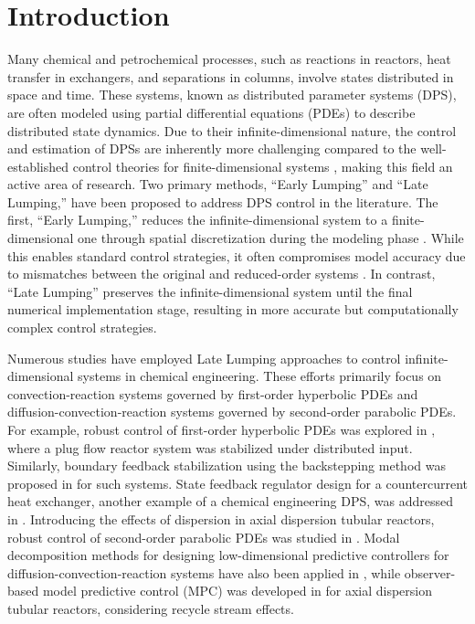 \section{Introduction}

Many chemical and petrochemical processes, such as reactions in reactors, heat transfer in exchangers, and separations in columns, involve states distributed in space and time. These systems, known as distributed parameter systems (DPS), are often modeled using partial differential equations (PDEs) to describe distributed state dynamics. Due to their infinite-dimensional nature, the control and estimation of DPSs are inherently more challenging compared to the well-established control theories for finite-dimensional systems \cite{ray1981advanced}, making this field an active area of research. Two primary methods, “Early Lumping” and “Late Lumping,” have been proposed to address DPS control in the literature. The first, “Early Lumping,” reduces the infinite-dimensional system to a finite-dimensional one through spatial discretization during the modeling phase \cite{davison1976robust}. While this enables standard control strategies, it often compromises model accuracy due to mismatches between the original and reduced-order systems \cite{moghadam2012infinite}. In contrast, “Late Lumping” preserves the infinite-dimensional system until the final numerical implementation stage, resulting in more accurate but computationally complex control strategies.

Numerous studies have employed Late Lumping approaches to control infinite-dimensional systems in chemical engineering. These efforts primarily focus on convection-reaction systems governed by first-order hyperbolic PDEs and diffusion-convection-reaction systems governed by second-order parabolic PDEs. For example, robust control of first-order hyperbolic PDEs was explored in \cite{christofides1996feedback}, where a plug flow reactor system was stabilized under distributed input. Similarly, boundary feedback stabilization using the backstepping method was proposed in \cite{krstic2008backstepping} for such systems. State feedback regulator design for a countercurrent heat exchanger, another example of a chemical engineering DPS, was addressed in \cite{xu2016state}. Introducing the effects of dispersion in axial dispersion tubular reactors, robust control of second-order parabolic PDEs was studied in \cite{christofides1998robust}. Modal decomposition methods for designing low-dimensional predictive controllers for diffusion-convection-reaction systems have also been applied in \cite{dubljevic2006predictive2}, while observer-based model predictive control (MPC) was developed in \cite{khatibi2021model} for axial dispersion tubular reactors, considering recycle stream effects.

